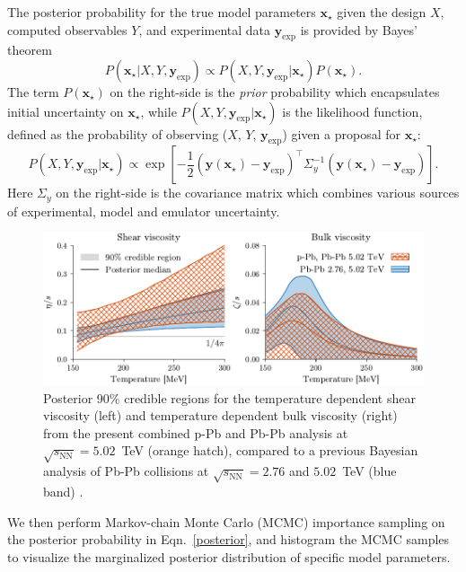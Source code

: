\documentclass[3p,times,procedia,sort&compress]{elsarticle}
\newcommand{\sqrts}{\sqrt{s_\mathrm{NN}}}
\begin{document}
The posterior probability for the true model parameters $\mathbf{x_\star}$ given the design $X$, computed observables $Y$, and experimental data $\mathbf{y}_\mathrm{exp}$ is provided by Bayes' theorem
\begin{equation}
  \label{posterior}
  P(\mathbf{x_\star}| X, Y, \mathbf{y}_\mathrm{exp}) \propto P(X, Y, \mathbf{y}_\mathrm{exp} | \mathbf{x_\star}) P(\mathbf{x_\star}).
\end{equation}
The term $P(\mathbf{x_\star})$ on the right-side is the \emph{prior} probability which encapsulates initial uncertainty on $\mathbf{x_\star}$, while $P(X, Y, \mathbf{y}_\mathrm{exp} | \mathbf{x_\star})$ is the likelihood function, defined as the probability of observing ($X$, $Y$, $\mathbf{y}_\text{exp}$) given a proposal for $\mathbf{x}_\star$:
\begin{equation}
  P(X, Y, \mathbf{y}_\mathrm{exp} | \mathbf{x_\star}) \propto \exp \left[ -\frac{1}{2}(\mathbf{y}(\mathbf{x_\star}) - \mathbf{y}_\mathrm{exp})^\top \Sigma_y^{-1} (\mathbf{y}(\mathbf{x_\star}) - \mathbf{y}_\mathrm{exp}) \right].
\end{equation}
Here $\Sigma_y$ on the right-side is the covariance matrix which combines various sources of experimental, model and emulator uncertainty.
\begin{figure}
  \centering
  \includegraphics[width=.9\textwidth]{region_shear_bulk}
  \caption{Posterior 90\% credible regions for the temperature dependent shear viscosity (left) and temperature dependent bulk viscosity (right) from the present combined p-Pb and Pb-Pb analysis at $\sqrts=5.02$~TeV (orange hatch), compared to a previous Bayesian analysis of Pb-Pb collisions at $\sqrts=2.76$ and $5.02$~TeV (blue band) \cite{Bernhard:2016tnd}.}
  \label{fig:viscosity}
\end{figure}
We then perform Markov-chain Monte Carlo (MCMC) importance sampling on the posterior probability in Eqn.~\eqref{posterior}, and histogram the MCMC samples to visualize the marginalized posterior distribution of specific model parameters.
\end{document}
